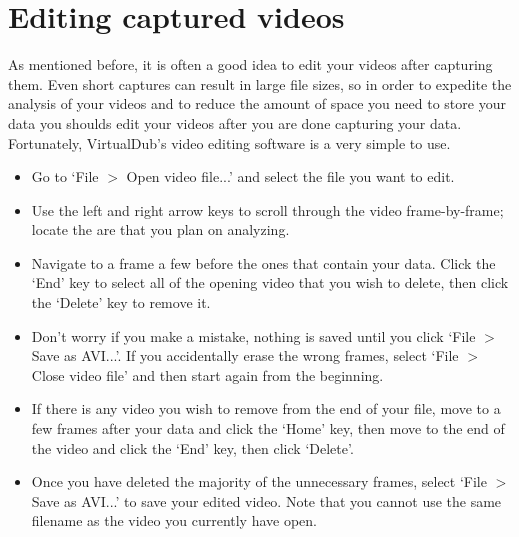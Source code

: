 \section*{Editing captured videos}
As mentioned before, it is often a good idea to edit your videos after capturing them.
Even short captures can result in large file sizes, so in order to expedite the analysis of your videos and to reduce the amount of space you need to store your data you shoulds edit your videos after you are done capturing your data.
Fortunately, VirtualDub's video editing software is a very simple to use.
\begin{itemize}
\item Go to `File $>$ Open video file...' and select the file you want to edit.
\item Use the left and right arrow keys to scroll through the video frame-by-frame; locate the are that you plan on analyzing.
\item Navigate to a frame a few before the ones that contain your data. Click the `End' key to select all of the opening video that you wish to delete, then click the `Delete' key to remove it.
\item Don't worry if you make a mistake, nothing is saved until you click `File $>$ Save as AVI...'. If you accidentally erase the wrong frames, select `File $>$ Close video file' and then start again from the beginning.
\item If there is any video you wish to remove from the end of your file, move to a few frames after your data and click the `Home' key, then move to the end of the video and click the `End' key, then click `Delete'.
\item Once you have deleted the majority of the unnecessary frames, select `File $>$ Save as AVI...' to save your edited video. Note that you cannot use the same filename as the video you currently have open.
\end{itemize}

